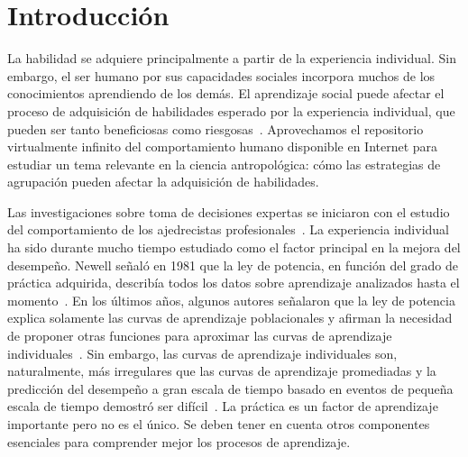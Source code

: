 \documentclass[a4paper,11pt]{book}
\theoremstyle{definition}
\begin{document}
\section{Introducci\'on}

La habilidad se adquiere principalmente a partir de la experiencia individual.
%
Sin embargo, el ser humano por sus capacidades sociales incorpora muchos de los conocimientos aprendiendo de los dem\'as.
%
El aprendizaje social puede afectar el proceso de adquisici\'on de habilidades esperado por la experiencia individual, que pueden ser tanto beneficiosas como riesgosas~\cite{Boyd2011}.
%
Aprovechamos el repositorio virtualmente infinito del comportamiento humano disponible en Internet para estudiar un tema relevante en la ciencia antropol\'ogica: c\'omo las estrategias de agrupaci\'on pueden afectar la adquisici\'on de habilidades.


Las investigaciones sobre toma de decisiones expertas se iniciaron con el estudio del comportamiento de los ajedrecistas profesionales~\cite{deGroot1978-thoughtAndChoiceInChess,chase1973-perceptionInChess,simon1974-howBigIsAChunk}.
%
La experiencia individual ha sido durante mucho tiempo estudiado como el factor principal en la mejora del desempe\~no.
%
Newell se\~nal\'o en 1981 que la ley de potencia, en funci\'on del grado de pr\'actica adquirida, describ\'ia todos los datos sobre aprendizaje analizados hasta el momento~\cite{Newell1981}.
%
En los \'ultimos a\~nos, algunos autores se\~nalaron que la ley de potencia explica solamente las curvas de aprendizaje poblacionales y afirman la necesidad de proponer otras funciones para aproximar las curvas de aprendizaje individuales~\cite{heathcote2000-powerLawRepealedExponentialLawOfPractice}.
%
Sin embargo, las curvas de aprendizaje individuales son, naturalmente, m\'as irregulares que las curvas de aprendizaje promediadas y la predicci\'on del desempe\~no a gran escala de tiempo basado en eventos de peque\~na escala de tiempo demostr\'o ser dif\'icil~\cite{howard2014-learningCurvesChessPlayersATestOfPowerLawGenerality}.
%
La pr\'actica es un factor de aprendizaje importante pero no es el \'unico.
%
Se deben tener en cuenta otros componentes esenciales para comprender mejor los procesos de aprendizaje.

\end{document}
